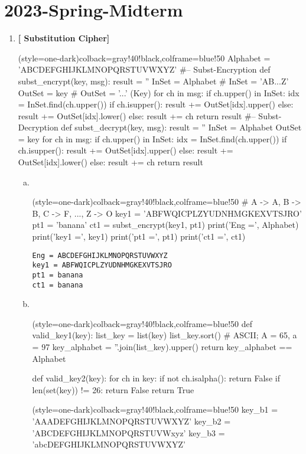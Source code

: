 \section{2023-Spring-Midterm}

\begin{enumerate}[\bf 1.]
	\item \textbf{[ Substitution Cipher]}
\begin{python}[](style=one-dark){colback=gray!40!black,colframe=blue!50}
Alphabet = 'ABCDEFGHIJKLMNOPQRSTUVWXYZ'
#-- Subst-Encryption
def subst_encrypt(key, msg):
	result = ''
	InSet = Alphabet     # InSet = 'AB...Z'
	OutSet = key 	# OutSet = '...' (Key)
	for ch in msg:
		if ch.upper() in InSet:
			idx = InSet.find(ch.upper())	
			if ch.isupper():
				result += OutSet[idx].upper() 
			else:
				result += OutSet[idx].lower()
		else:
			result += ch
	return result
#-- Subst-Decryption
def subst_decrypt(key, msg):
    result = ''
	InSet = Alphabet
	OutSet = key	
	for ch in msg:
		if ch.upper() in InSet:
			idx = InSet.find(ch.upper())
			if ch.isupper():
				result += OutSet[idx].upper()
			else:
				result += OutSet[idx].lower()
		else:
			result += ch
	return result
\end{python}
\begin{enumerate}[(a)]
	\item \ 
\begin{python}[](style=one-dark){colback=gray!40!black,colframe=blue!50}
# A -> A, B -> B, C -> F, ..., Z -> O
key1 = 'ABFWQICPLZYUDNHMGKEXVTSJRO'
pt1 = 'banana'
ct1 = subst_encrypt(key1, pt1)
print('Eng =', Alphabet)
print('key1 =', key1)
print('pt1 =', pt1)
print('ct1 =', ct1)
\end{python}
\begin{lstlisting}[style=terminal]
Eng = ABCDEFGHIJKLMNOPQRSTUVWXYZ
key1 = ABFWQICPLZYUDNHMGKEXVTSJRO
pt1 = banana
ct1 = banana
\end{lstlisting}
	\item \
\begin{python}[](style=one-dark){colback=gray!40!black,colframe=blue!50}
def valid_key1(key):
	list_key = list(key)
	list_key.sort() # ASCII; A = 65, a = 97
	key_alphabet = ''.join(list_key).upper()
	return key_alphabet == Alphabet

def valid_key2(key):
	for ch in key:
		if not ch.isalpha():
			return False
		if len(set(key)) != 26:
			return False
	return True
\end{python}
\begin{python}[](style=one-dark){colback=gray!40!black,colframe=blue!50}
key_b1 = 'AAADEFGHIJKLMNOPQRSTUVWXYZ'
key_b2 = 'ABCDEFGHIJKLMNOPQRSTUVWxyz'
key_b3 = 'abcDEFGHIJKLMNOPQRSTUVWXYZ'


\end{python}
\end{enumerate}
\end{enumerate}
